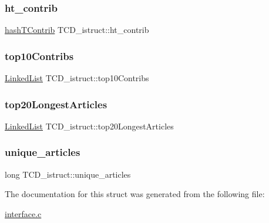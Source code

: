 \subsubsection{\texorpdfstring{ht\+\_\+contrib}{ht\_contrib}}
{\footnotesize\ttfamily \hyperlink{hashTContrib_8h_a2d4cbdc8189a569f5fc4890fe1d84ef3}{hash\+T\+Contrib} T\+C\+D\+\_\+istruct\+::ht\+\_\+contrib}

\mbox{\label{structTCD__istruct_a83ca2148dbfd4909aad477931c1bb8c3}} 
\subsubsection{\texorpdfstring{top10\+Contribs}{top10Contribs}}
{\footnotesize\ttfamily \hyperlink{linkedList_8h_a2266b5434491632a8342c9f636f413c6}{Linked\+List} T\+C\+D\+\_\+istruct\+::top10\+Contribs}

\mbox{\label{structTCD__istruct_a06bb74736a9c7fb8a0d8ddbbc0ef58e3}} 
\subsubsection{\texorpdfstring{top20\+Longest\+Articles}{top20LongestArticles}}
{\footnotesize\ttfamily \hyperlink{linkedList_8h_a2266b5434491632a8342c9f636f413c6}{Linked\+List} T\+C\+D\+\_\+istruct\+::top20\+Longest\+Articles}

\mbox{\label{structTCD__istruct_a9da24baac897176a33d49d099dbdd96d}} 
\subsubsection{\texorpdfstring{unique\+\_\+articles}{unique\_articles}}
{\footnotesize\ttfamily long T\+C\+D\+\_\+istruct\+::unique\+\_\+articles}



The documentation for this struct was generated from the following file\+:\begin{DoxyCompactItemize}
\item 
\hyperlink{interface_8c}{interface.\+c}\end{DoxyCompactItemize}
